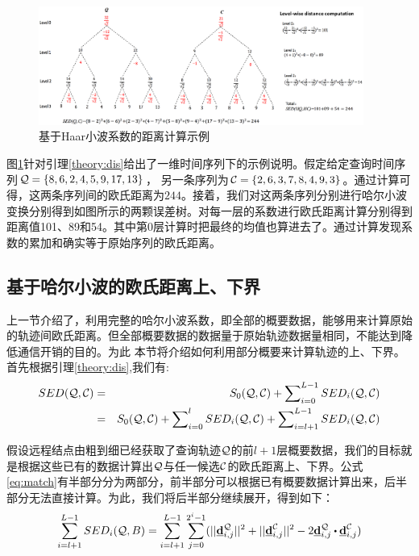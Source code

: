 \begin{figure}
	\centering
	\includegraphics[width=0.95\textwidth]{Fig/chapter4/distance}
	\caption{基于Haar小波系数的距离计算示例}
	\label{fig-chapter4-distance}
\end{figure}

图\ref{fig-chapter4-distance}针对引理\ref{theory:dis}给出了一维时间序列下的示例说明。假定给定查询时间序列${\cal Q} = \{8, 6, 2, 4, 5, 9, 17, 13\}$，
另一条序列为${\cal C}=\{2, 6, 3, 7, 8, 4, 9, 3\}$。通过计算可得，这两条序列间的欧氏距离为$244$。接着，我们对这两条序列分别进行哈尔小波变换分别得到如图所示的两颗误差树。对每一层的系数进行欧氏距离计算分别得到距离值101、89和54。其中第$0$层计算时把最终的均值也算进去了。通过计算发现系数的累加和确实等于原始序列的欧氏距离。

\subsection{基于哈尔小波的欧氏距离上、下界}
上一节介绍了，利用完整的哈尔小波系数，即全部的概要数据，能够用来计算原始的轨迹间欧氏距离。但全部概要数据的数据量于原始轨迹数据量相同，不能达到降低通信开销的目的。为此
本节将介绍如何利用部分概要来计算轨迹的上、下界。首先根据引理\ref{theory:dis},我们有:
\begin{eqnarray}\label{eq:match}
SED({\cal Q},{\cal C}) &=&S_{0}({\cal Q},{\cal C}) +  \sum\nolimits_{i=0}^{L-1}SED_{i}({\cal Q},{\cal C}) \nonumber\\ 
           &=&S_{0}({\cal Q},{\cal C}) + \sum\nolimits_{i=0}^{l}SED_{i}({\cal Q},{\cal C})+\sum\nolimits_{i=l+1}^{L-1}SED_{i}({\cal Q},{\cal C})
\end{eqnarray}

假设远程结点由粗到细已经获取了查询轨迹$\cal Q$的前$l+1$层概要数据，我们的目标就是根据这些已有的数据计算出$\cal Q$与任一候选$\cal C$的欧氏距离上、下界。公式 \ref{eq:match}有半部分分为两部分，前半部分可以根据已有概要数据计算出来，后半部分无法直接计算。为此，我们将后半部分继续展开，得到如下：
\begin{eqnarray}\label{eq:decompose}
\sum_{i=l+1}^{L-1}SED_{i}({\cal Q},B)= \sum_{i=l+1}^{L-1}\sum_{j=0}^{2^i-1}(||\vd_{i,j}^{\cal Q}||^2+||\vd_{i,j}^{\cal C}||^2 -
2  \vd_{i,j}^{\cal Q} \bigcdot \vd_{i,j}^{\cal C}) 
\end{eqnarray}

